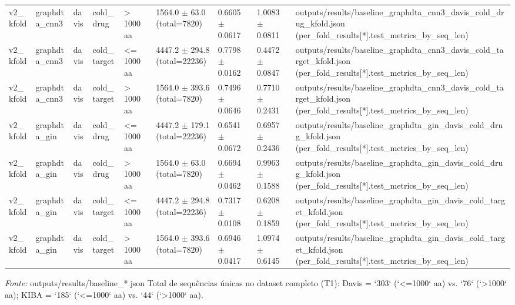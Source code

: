 \begin{table}[htbp]
\begin{tabular}{lllllllll}
v2\_kfold & graphdta\_cnn3 & davis & cold\_drug & > 1000 aa & 1564.0 $\pm$ 63.0 (total=7820) & 0.6605 $\pm$ 0.0617 & 1.0083 $\pm$ 0.0811 & outputs/results/baseline\_graphdta\_cnn3\_davis\_cold\_drug\_kfold.json (per\_fold\_results[*].test\_metrics\_by\_seq\_len) \\
v2\_kfold & graphdta\_cnn3 & davis & cold\_target & <= 1000 aa & 4447.2 $\pm$ 294.8 (total=22236) & 0.7798 $\pm$ 0.0162 & 0.4472 $\pm$ 0.0847 & outputs/results/baseline\_graphdta\_cnn3\_davis\_cold\_target\_kfold.json (per\_fold\_results[*].test\_metrics\_by\_seq\_len) \\
v2\_kfold & graphdta\_cnn3 & davis & cold\_target & > 1000 aa & 1564.0 $\pm$ 393.6 (total=7820) & 0.7496 $\pm$ 0.0646 & 0.7710 $\pm$ 0.2431 & outputs/results/baseline\_graphdta\_cnn3\_davis\_cold\_target\_kfold.json (per\_fold\_results[*].test\_metrics\_by\_seq\_len) \\
v2\_kfold & graphdta\_gin & davis & cold\_drug & <= 1000 aa & 4447.2 $\pm$ 179.1 (total=22236) & 0.6541 $\pm$ 0.0672 & 0.6957 $\pm$ 0.2436 & outputs/results/baseline\_graphdta\_gin\_davis\_cold\_drug\_kfold.json (per\_fold\_results[*].test\_metrics\_by\_seq\_len) \\
v2\_kfold & graphdta\_gin & davis & cold\_drug & > 1000 aa & 1564.0 $\pm$ 63.0 (total=7820) & 0.6694 $\pm$ 0.0462 & 0.9963 $\pm$ 0.1588 & outputs/results/baseline\_graphdta\_gin\_davis\_cold\_drug\_kfold.json (per\_fold\_results[*].test\_metrics\_by\_seq\_len) \\
v2\_kfold & graphdta\_gin & davis & cold\_target & <= 1000 aa & 4447.2 $\pm$ 294.8 (total=22236) & 0.7317 $\pm$ 0.0108 & 0.6208 $\pm$ 0.1859 & outputs/results/baseline\_graphdta\_gin\_davis\_cold\_target\_kfold.json (per\_fold\_results[*].test\_metrics\_by\_seq\_len) \\
v2\_kfold & graphdta\_gin & davis & cold\_target & > 1000 aa & 1564.0 $\pm$ 393.6 (total=7820) & 0.6946 $\pm$ 0.0417 & 1.0974 $\pm$ 0.6145 & outputs/results/baseline\_graphdta\_gin\_davis\_cold\_target\_kfold.json (per\_fold\_results[*].test\_metrics\_by\_seq\_len) \\
\bottomrule
\end{tabular}
\begin{flushleft}
\footnotesize \textit{Fonte:} outputs/results/baseline\_*.json Total de sequências únicas no dataset completo (T1): Davis = `303` (`<=1000` aa) vs. `76` (`>1000` aa); KIBA = `185` (`<=1000` aa) vs. `44` (`>1000` aa).
\end{flushleft}
\end{table}
